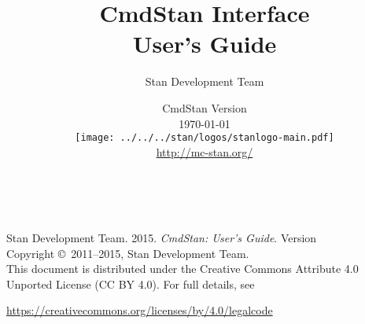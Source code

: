 \title{\Huge\bf CmdStan Interface \\[4pt] {\LARGE User's Guide}}
\author{Stan Development Team}

\date{\vspace*{36pt} CmdStan Version \cmdstanversion
\\[8pt] {\small \today}
\\[36pt]
{
\vfill
\texttt{[image: ../../../stan/logos/stanlogo-main.pdf]}}
\\
\vspace*{6pt}
{\small \url{http://mc-stan.org/}}
}
\maketitle

\newpage
\thispagestyle{empty}
\mbox{ }
\vfill
\begin{center}
\begin{minipage}[t]{0.75\textwidth}
\small
Stan Development Team. 2015.  
{\it CmdStan: User's Guide}. Version
\cmdstanversion
\vspace*{20pt}
\mbox{ }
\\
Copyright \copyright \ 2011--2015, Stan Development Team.
\vspace*{28pt}
\mbox{} \\
This document is distributed under the Creative Commons Attribute 4.0
Unported License (CC BY 4.0).  For full details, see
\begin{center}
\url{https://creativecommons.org/licenses/by/4.0/legalcode} 
\end{center}
\end{minipage}
\vspace*{24pt}
\mbox{ }
\end{center}
